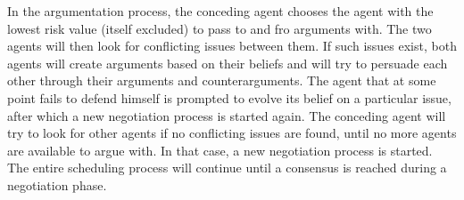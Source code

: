 In the argumentation process, the conceding agent chooses the agent with 
the lowest risk value (itself excluded) to pass to and fro arguments with. 
The two agents will then look for conflicting issues between them. If such 
issues exist, both agents will create arguments based on their beliefs and 
will try to persuade each other through their arguments and 
counterarguments. The agent that at some point fails to defend himself is 
prompted to evolve its belief on a particular issue, after which a new 
negotiation process is started again. The conceding agent will try to look 
for other agents if no conflicting issues are found, until no more agents 
are available to argue with. In that case, a new negotiation process is 
started. The entire scheduling process will continue until a consensus is 
reached during a negotiation phase.
